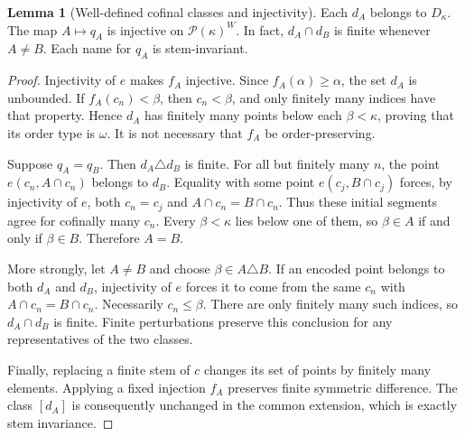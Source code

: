 \documentclass[11pt,letterpaper]{article}
\theoremstyle{definition}
\newtheorem{lemma}[definition]{Lemma}
\numberwithin{equation}{section}
\newcommand{\Pow}{\mathcal P}
\begin{document}
\begin{lemma}[Well-defined cofinal classes and injectivity]\label{lem:distinct}
Each $d_A$ belongs to $D_\kappa$. The map $A\mapsto q_A$ is injective on $\Pow(\kappa)^W$. In fact, $d_A\cap d_B$ is finite whenever $A\ne B$. Each name for $q_A$ is stem-invariant.
\end{lemma}
\begin{proof}
Injectivity of $e$ makes $f_A$ injective. Since $f_A(\alpha)\ge\alpha$, the set $d_A$ is unbounded. If $f_A(c_n)<\beta$, then $c_n<\beta$, and only finitely many indices have that property. Hence $d_A$ has finitely many points below each $\beta<\kappa$, proving that its order type is $\omega$. It is not necessary that $f_A$ be order-preserving.

Suppose $q_A=q_B$. Then $d_A\triangle d_B$ is finite. For all but finitely many $n$, the point $e(c_n,A\cap c_n)$ belongs to $d_B$. Equality with some point $e(c_j,B\cap c_j)$ forces, by injectivity of $e$, both $c_n=c_j$ and $A\cap c_n=B\cap c_n$. Thus these initial segments agree for cofinally many $c_n$. Every $\beta<\kappa$ lies below one of them, so $\beta\in A$ if and only if $\beta\in B$. Therefore $A=B$.

More strongly, let $A\ne B$ and choose $\beta\in A\triangle B$. If an encoded point belongs to both $d_A$ and $d_B$, injectivity of $e$ forces it to come from the same $c_n$ with $A\cap c_n=B\cap c_n$. Necessarily $c_n\le\beta$. There are only finitely many such indices, so $d_A\cap d_B$ is finite. Finite perturbations preserve this conclusion for any representatives of the two classes.

Finally, replacing a finite stem of $c$ changes its set of points by finitely many elements. Applying a fixed injection $f_A$ preserves finite symmetric difference. The class $[d_A]$ is consequently unchanged in the common extension, which is exactly stem invariance.
\end{proof}
\end{document}

